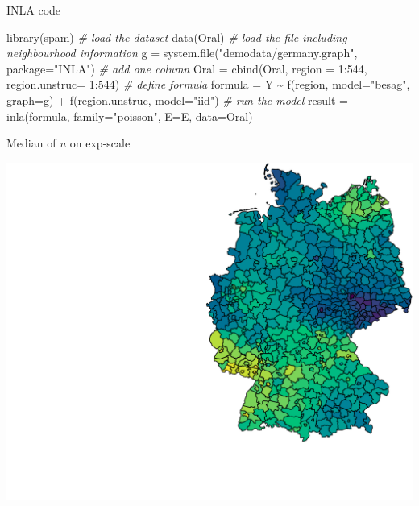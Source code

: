 \documentclass[
  handout]{beamer}
\newenvironment{Shaded}{\begin{snugshade}}{\end{snugshade}}
\newcommand{\AttributeTok}[1]{\textcolor[rgb]{0.77,0.63,0.00}{#1}}
\newcommand{\CommentTok}[1]{\textcolor[rgb]{0.56,0.35,0.01}{\textit{#1}}}
\newcommand{\DecValTok}[1]{\textcolor[rgb]{0.00,0.00,0.81}{#1}}
\newcommand{\FunctionTok}[1]{\textcolor[rgb]{0.00,0.00,0.00}{#1}}
\newcommand{\NormalTok}[1]{#1}
\newcommand{\OtherTok}[1]{\textcolor[rgb]{0.56,0.35,0.01}{#1}}
\newcommand{\SpecialCharTok}[1]{\textcolor[rgb]{0.00,0.00,0.00}{#1}}
\newcommand{\StringTok}[1]{\textcolor[rgb]{0.31,0.60,0.02}{#1}}
\begin{document}
\begin{frame}[fragile]{INLA code}
\protect\hypertarget{inla-code}{}
\begin{Shaded}
\begin{Highlighting}[]
\FunctionTok{library}\NormalTok{(spam)}
\CommentTok{\# load the dataset}
\FunctionTok{data}\NormalTok{(Oral)}
\CommentTok{\# load the file including neighbourhood information}
\NormalTok{g }\OtherTok{=} \FunctionTok{system.file}\NormalTok{(}\StringTok{"demodata/germany.graph"}\NormalTok{, }\AttributeTok{package=}\StringTok{"INLA"}\NormalTok{)}
\CommentTok{\# add one column }
\NormalTok{Oral }\OtherTok{=} \FunctionTok{cbind}\NormalTok{(Oral, }\AttributeTok{region =} \DecValTok{1}\SpecialCharTok{:}\DecValTok{544}\NormalTok{, }\AttributeTok{region.unstruc=} \DecValTok{1}\SpecialCharTok{:}\DecValTok{544}\NormalTok{)}
\CommentTok{\# define formula}
\NormalTok{formula }\OtherTok{=}\NormalTok{ Y }\SpecialCharTok{\textasciitilde{}} \FunctionTok{f}\NormalTok{(region, }\AttributeTok{model=}\StringTok{"besag"}\NormalTok{, }\AttributeTok{graph=}\NormalTok{g) }\SpecialCharTok{+}
                           \FunctionTok{f}\NormalTok{(region.unstruc, }\AttributeTok{model=}\StringTok{"iid"}\NormalTok{)}
\CommentTok{\# run the model}
\NormalTok{result }\OtherTok{=} \FunctionTok{inla}\NormalTok{(formula, }\AttributeTok{family=}\StringTok{"poisson"}\NormalTok{, }\AttributeTok{E=}\NormalTok{E, }\AttributeTok{data=}\NormalTok{Oral)}
\end{Highlighting}
\end{Shaded}
\end{frame}

\begin{frame}{Median of \(u\) on exp-scale}
\protect\hypertarget{median-of-u-on-exp-scale}{}
\small

\begin{center}\includegraphics[width=0.6\linewidth]{Part2_RINLA_files/figure-beamer/unnamed-chunk-47-1} \end{center}
\end{frame}
\end{document}
